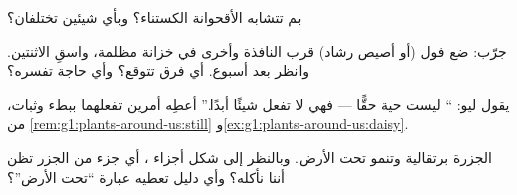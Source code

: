 \begin{exercise}[$\star$]\label{exo:g1:plants-around-us:7}
بم تتشابه الأقحوانة  الكستناء؟ وبأي شيئين تختلفان؟
\end{exercise}

\begin{exercise}[$\star$]\label{exo:g1:plants-around-us:8}
جرّب: ضع  فول (أو أصيص رشاد) قرب النافذة وأخرى في خزانة
مظلمة، واسقِ الاثنتين. وانظر بعد أسبوع. أي فرق تتوقع؟ وأي حاجة
تفسره؟
\end{exercise}

\begin{exercise}[$\star\star$]\label{exo:g1:plants-around-us:9}
يقول ليو: `` ليست حية حقًّا --- فهي لا تفعل شيئًا أبدًا.''
أعطِه أمرين تفعلهما  ببطء وثبات، من
\cref{rem:g1:plants-around-us:still} و\cref{ex:g1:plants-around-us:daisy}.
\end{exercise}

\begin{exercise}[$\star\star$]\label{exo:g1:plants-around-us:10}
الجزرة برتقالية وتنمو تحت الأرض. وبالنظر إلى شكل أجزاء ، أي
جزء من  الجزر تظن أننا نأكله؟ وأي دليل تعطيه عبارة ``تحت
الأرض''؟
\end{exercise}
